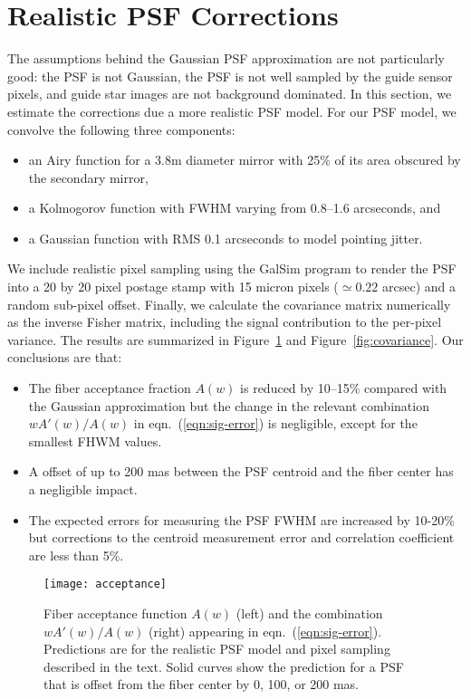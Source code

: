 \documentclass[11pt]{article}
\providecommand{\eqn}[1]{eqn.~(\ref{eqn:#1})}
\providecommand{\fig}[1]{Figure~\ref{fig:#1}}
\begin{document}
\section{Realistic PSF Corrections}

The assumptions behind the Gaussian PSF approximation are not particularly good: the PSF is not Gaussian, the PSF is not well sampled by the guide sensor pixels, and guide star images are not background dominated. In this section, we estimate the corrections due a more realistic PSF model. For our PSF model, we convolve the following three components:
\begin{itemize}
\item an Airy function for a 3.8m diameter mirror with 25\% of its area obscured by the secondary mirror,
\item a Kolmogorov function with FWHM varying from 0.8--1.6 arcseconds, and
\item a Gaussian function with RMS 0.1 arcseconds to model pointing jitter.
\end{itemize}
We include realistic pixel sampling using the GalSim program to render the PSF into a 20 by 20 pixel postage stamp with 15 micron pixels ($\simeq 0.22$ arcsec) and a random sub-pixel offset. Finally, we calculate the covariance matrix numerically as the inverse Fisher matrix, including the signal contribution to the per-pixel variance. The results are summarized in \fig{acceptance} and \fig{covariance}. Our conclusions are that:
\begin{itemize}
\item The fiber acceptance fraction $A(w)$ is reduced by 10--15\% compared with the Gaussian approximation but the change in the relevant combination $w A'(w)/A(w)$ in \eqn{sig-error} is negligible, except for the smallest FHWM values.
\item A offset of up to 200 mas between the PSF centroid and the fiber center has a negligible impact.
\item The expected errors for measuring the PSF FWHM are increased by 10-20\% but corrections to the centroid measurement error and correlation coefficient are less than 5\%.
\end{itemize}

\begin{figure}[htb]
\begin{center}
\texttt{[image: acceptance]}
\caption{Fiber acceptance function $A(w)$ (left) and the combination $w A'(w)/A(w)$ (right) appearing in \eqn{sig-error}. Predictions are for the realistic PSF model and pixel sampling described in the text. Solid curves show the prediction for a PSF that is offset from the fiber center by 0, 100, or 200 mas.}
\label{fig:acceptance}
\end{center}
\end{figure}
\end{document}
